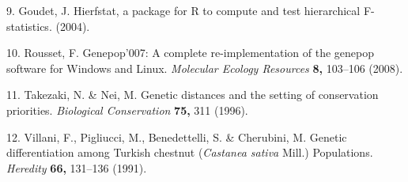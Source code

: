 \documentclass[12pt,a4paper,]{report}
\begin{document}
\leavevmode\hypertarget{ref-goudet_hierfstat_2004}{}%
9. Goudet, J. Hierfstat, a package for R to compute and test
hierarchical F-statistics. (2004).

\leavevmode\hypertarget{ref-rousset_genepop007:_2008}{}%
10. Rousset, F. Genepop'007: A complete re-implementation of the genepop
software for Windows and Linux. \emph{Molecular Ecology Resources}
\textbf{8,} 103--106 (2008).

\leavevmode\hypertarget{ref-takezaki_genetic_1996}{}%
11. Takezaki, N. \& Nei, M. Genetic distances and the setting of
conservation priorities. \emph{Biological Conservation} \textbf{75,} 311
(1996).

\leavevmode\hypertarget{ref-villani_genetic_1991}{}%
12. Villani, F., Pigliucci, M., Benedettelli, S. \& Cherubini, M.
Genetic differentiation among Turkish chestnut (\emph{Castanea sativa}
Mill.) Populations. \emph{Heredity} \textbf{66,} 131--136 (1991).
\end{document}
